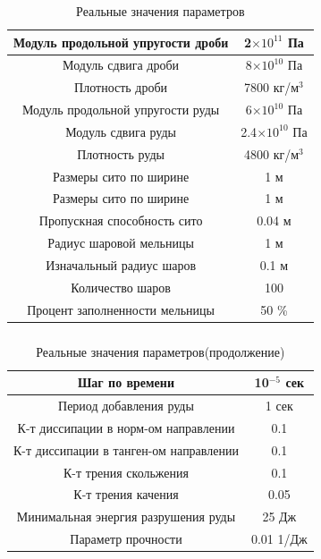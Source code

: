 \documentclass[c]{beamer}  %
\begin{document}

\begin{frame}
\frametitle{\insertsection} 
\framesubtitle{\insertsubsection}

\begin{table}[H]
\caption{Реальные значения параметров}
\begin{tabular}{|c|c|}
\hline
Модуль продольной упругости дроби & 2$\times 10^{11}$ Па  \\ 
\hline
Модуль сдвига дроби & 8$\times 10^{10}$ Па \\  
\hline
Плотность дроби & 7800 кг/м$^3$ \\
\hline
Модуль продольной упругости руды & 6$\times 10^{10}$ Па  \\ 
\hline
Модуль сдвига руды & 2.4$\times 10^{10}$ Па \\  
\hline
Плотность руды & 4800 кг/м$^3$ \\
\hline
Размеры сито по ширине & 1 м \\
\hline
Размеры сито по ширине & 1 м \\
\hline
Пропускная способность сито & 0.04 м \\
\hline
Радиус шаровой мельницы & 1 м \\
\hline
Изначальный радиус шаров & 0.1 м \\
\hline
Количество шаров & 100 \\
\hline
Процент заполненности мельницы & 50 \% \\
\hline
\end{tabular}
\end{table}
\end{frame}

\begin{frame}
\frametitle{\insertsection} 
\framesubtitle{\insertsubsection}

\begin{table}[H]
\caption{Реальные значения параметров(продолжение)}
\begin{tabular}{|c|c|}

\hline
Шаг по времени & 10$^{-5}$ сек \\
\hline
Период добавления руды & 1 сек \\
\hline
К-т диссипации в норм-ом направлении & 0.1 \\
\hline
К-т диссипации в танген-ом направлении & 0.1 \\
\hline
К-т трения скольжения & 0.1 \\
\hline
К-т трения качения & 0.05 \\
\hline
Минимальная энергия разрушения руды & 25 Дж \\
\hline
Параметр прочности & 0.01 1/Дж \\
\hline
\end{tabular}
\end{table}
\end{frame}
\end{document}
